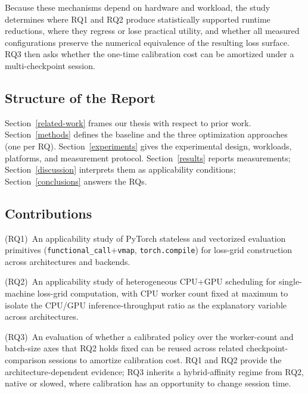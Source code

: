 \documentclass[conference]{IEEEtran}
\begin{document}
Because these mechanisms depend on hardware
and workload, the study determines where RQ1 and RQ2 produce
statistically supported runtime reductions, where they regress or
lose practical utility, and whether all measured configurations
preserve the numerical equivalence of the resulting loss surface.
RQ3 then asks whether the one-time calibration cost can be amortized under a multi-checkpoint session.

\subsection{Structure of the Report}\label{structure-of-the-report}

Section~\ref{related-work} frames our thesis with respect to prior work.
Section~\ref{methods} defines the baseline and the three
optimization approaches (one per RQ).
Section~\ref{experiments} gives the experimental design,
workloads, platforms, and measurement protocol.
Section~\ref{results} reports measurements;
Section~\ref{discussion} interprets them as applicability
conditions; Section~\ref{conclusions} answers the RQs.

\subsection{Contributions}\label{contributions}

(RQ1)~An applicability study of PyTorch stateless and
vectorized evaluation primitives
(\texttt{functional\_call}+\texttt{vmap},
\texttt{torch.compile}) for loss-grid construction across
architectures and backends.

(RQ2)~An applicability study of heterogeneous CPU+GPU
scheduling for single-machine loss-grid computation, with
CPU worker count fixed at maximum to isolate the CPU/GPU
inference-throughput ratio as the explanatory variable
across architectures.

(RQ3)~An evaluation of whether a calibrated policy over the
worker-count and batch-size axes that RQ2 holds fixed can be
reused across related checkpoint-comparison sessions to
amortize calibration cost. RQ1 and RQ2 provide the
architecture-dependent evidence; RQ3 inherits a
hybrid-affinity regime from RQ2, native or slowed, where
calibration has an opportunity to change session time.









\end{document}
